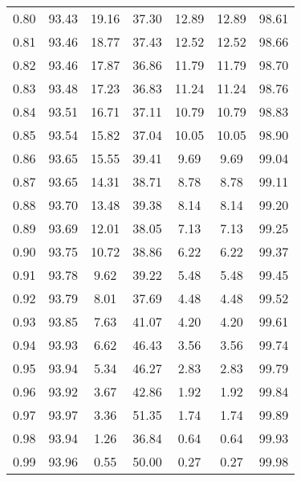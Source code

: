\begin{tabular}{|c|c|c|c|c|c|c|}
      0.80 &     93.43 &     19.16 &      37.30 &   12.89 &      12.89 &         98.61 \\
      0.81 &     93.46 &     18.77 &      37.43 &   12.52 &      12.52 &         98.66 \\
      0.82 &     93.46 &     17.87 &      36.86 &   11.79 &      11.79 &         98.70 \\
      0.83 &     93.48 &     17.23 &      36.83 &   11.24 &      11.24 &         98.76 \\
      0.84 &     93.51 &     16.71 &      37.11 &   10.79 &      10.79 &         98.83 \\
      0.85 &     93.54 &     15.82 &      37.04 &   10.05 &      10.05 &         98.90 \\
      0.86 &     93.65 &     15.55 &      39.41 &    9.69 &       9.69 &         99.04 \\
      0.87 &     93.65 &     14.31 &      38.71 &    8.78 &       8.78 &         99.11 \\
      0.88 &     93.70 &     13.48 &      39.38 &    8.14 &       8.14 &         99.20 \\
      0.89 &     93.69 &     12.01 &      38.05 &    7.13 &       7.13 &         99.25 \\
      0.90 &     93.75 &     10.72 &      38.86 &    6.22 &       6.22 &         99.37 \\
      0.91 &     93.78 &      9.62 &      39.22 &    5.48 &       5.48 &         99.45 \\
      0.92 &     93.79 &      8.01 &      37.69 &    4.48 &       4.48 &         99.52 \\
      0.93 &     93.85 &      7.63 &      41.07 &    4.20 &       4.20 &         99.61 \\
      0.94 &     93.93 &      6.62 &      46.43 &    3.56 &       3.56 &         99.74 \\
      0.95 &     93.94 &      5.34 &      46.27 &    2.83 &       2.83 &         99.79 \\
      0.96 &     93.92 &      3.67 &      42.86 &    1.92 &       1.92 &         99.84 \\
      0.97 &     93.97 &      3.36 &      51.35 &    1.74 &       1.74 &         99.89 \\
      0.98 &     93.94 &      1.26 &      36.84 &    0.64 &       0.64 &         99.93 \\
      0.99 &     93.96 &      0.55 &      50.00 &    0.27 &       0.27 &         99.98 \\
\bottomrule
\end{tabular}
